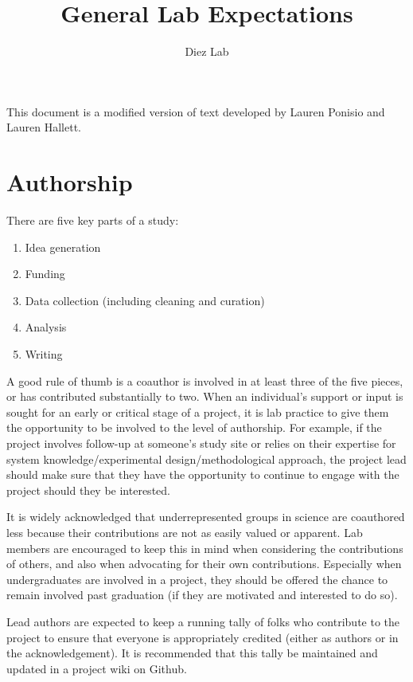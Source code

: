 \documentclass[12pt]{article}
\title{General Lab Expectations}
\author{Diez Lab}
\begin{document}
\maketitle

This document is a modified version of text developed by Lauren Ponisio and Lauren Hallett.

\section{Authorship}
There are five key parts of a study:
\begin{enumerate}
\item Idea generation
\item Funding 
\item Data collection (including cleaning and curation)
\item Analysis
\item Writing
\end{enumerate}

A good rule of thumb is a coauthor is involved in at least three of the five pieces, or has contributed substantially to two. When an individual's support or input is sought for an early or critical stage of a project, it is lab practice to give them the opportunity to be involved to the level of authorship. For example, if the project involves follow-up at someone's study site or relies on their expertise for system knowledge/experimental design/methodological approach, the project lead should make sure that they have the opportunity to continue to engage with the project should they be interested. 

It is widely acknowledged that underrepresented groups in science are coauthored less because their contributions are
not as easily valued or apparent. Lab members are encouraged to keep this in mind when considering the contributions of others, and also when advocating for their own contributions. Especially when undergraduates are involved in a project, they should be offered the chance to remain involved past graduation (if they are motivated and interested to do so). 

Lead authors are expected to keep a running tally of folks who contribute to the project to ensure that everyone is appropriately credited (either as authors or in the acknowledgement). It is recommended that this tally be maintained and updated in a project wiki on Github.
\end{document}
